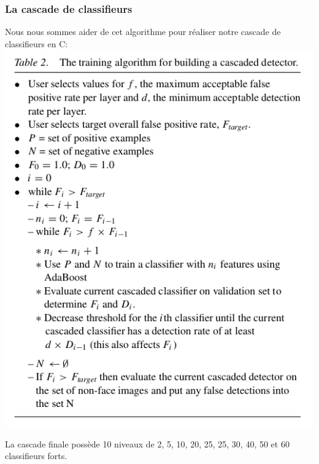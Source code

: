 \documentclass[12pt,a4paper]{article}
\begin{document}
\newpage
\subsubsection{La cascade de classifieurs}
Nous nous sommes aider de cet algorithme pour réaliser notre cascade de classifieurs en C:
\vspace{0.8cm}
\newline
\includegraphics[scale=.7]{Pictures/cascade.png}

\newpage
La cascade finale possède 10 niveaux de 2, 5, 10, 20, 25, 25, 30, 40, 50 et 60 classifieurs forts. 
\end{document}
